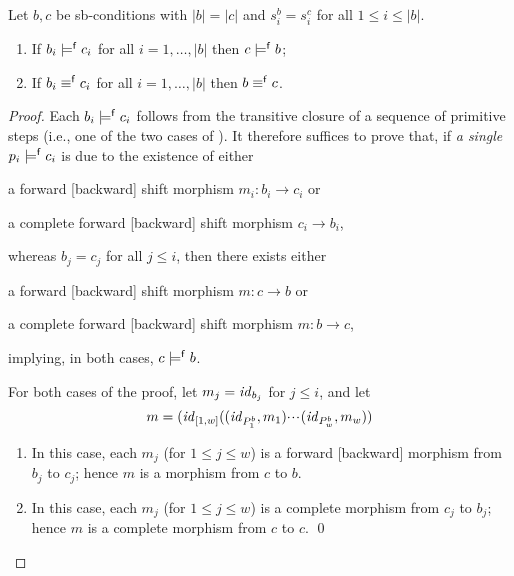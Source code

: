 \begin{proposition}
Let $b,c$ be sb-conditions with $|b|=|c|$ and $s^b_i=s^c_i$ for all $1\leq i\leq |b|$.
\begin{enumerate}[topsep=\smallskipamount]
\item If $b_i\models^{\mathsf f} c_i$ for all $i=1,\ldots,|b|$ then $c\models^{\mathsf f} b$;
\item If $b_i\equiv^{\mathsf f} c_i$ for all $i=1,\ldots,|b|$ then $b\equiv^{\mathsf f} c$.
\end{enumerate}
\end{proposition}
%
\begin{proof}
Each $b_i\models^{\mathsf f} c_i$ follows from the transitive closure of a sequence of primitive steps (i.e., one of the two cases of ). It therefore suffices to prove that, if \emph{a single} $p_i\models^{\mathsf f} c_i$ is due to the existence of either
\begin{enumerate*}[label=(\roman*)]
\item a forward [backward] shift morphism $m_i:b_i\to c_i$ or
\item a complete forward [backward] shift morphism $c_i\to b_i$,
\end{enumerate*}
whereas $b_j=c_j$ for all $j\leq i$, then there exists either
\begin{enumerate*}[label=(\roman*)]
\item a forward [backward] shift morphism $m:c\to b$ or 
\item a complete forward [backward] shift morphism $m:b\to c$,
\end{enumerate*}
implying, in both cases, $c\models^{\mathsf f} b$.

\smallskip
For both cases of the proof, let $m_j=\mathit{id}_{b_j}$ for $j\leq i$, and let
%
\[ m = (\mathit{id}_{[1,w]}((\mathit{id}_{P^b_1},m_1){\cdotp\mkern-2mu\cdotp\mkern-2mu\cdotp\mkern1mu} (\mathit{id}_{P^b_w},m_w)) \]
%
\begin{enumerate}[label=(\roman*)]
\item In this case, each $m_j$ (for $1\leq j\leq w$) is a forward [backward] morphism from $b_j$ to $c_j$; hence $m$ is a morphism from $c$ to $b$.

\item In this case, each $m_j$ (for $1\leq j\leq w$) is a complete morphism from $c_j$ to $b_j$; hence $m$ is a complete morphism from $c$ to $c$.
\qed
\end{enumerate}
\end{proof}
